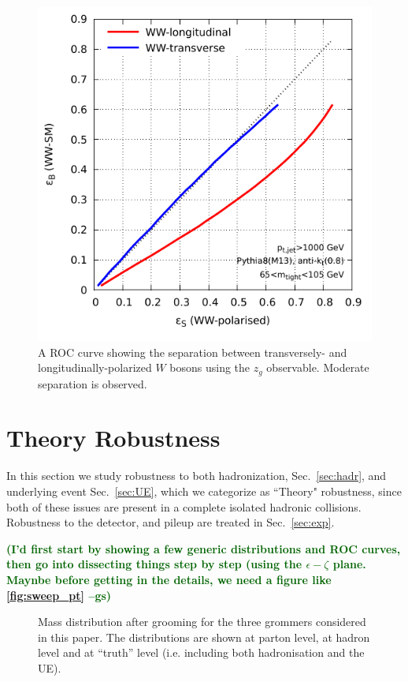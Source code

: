 \documentclass[11pt,letterpaper]{article}
\DeclareRobustCommand{\Sec}[1]{Sec.~\ref{#1}}
\newcommand{\gs}[1]{\textbf{\textcolor{darkgreen}{(#1 --gs)}}}
\begin{document}
\begin{figure}
\begin{center}
\includegraphics[width=0.45\columnwidth]{figures/polarisation-zg-roc}
\end{center}
\caption{A ROC curve showing the separation between transversely- and longitudinally-polarized $W$ bosons using the $z_g$ observable. Moderate separation is observed.}
\label{fig:z_g_ROC}
\end{figure}



\section{Theory Robustness}\label{sec:np}


In this section we study robustness to both hadronization, \Sec{sec:hadr}, and underlying event \Sec{sec:UE}, which we categorize as ``Theory" robustness, since both of these issues are present in a complete isolated hadronic collisions. Robustness to the detector, and pileup are treated in \Sec{sec:exp}. 


\gs{I'd first start by showing a few generic distributions and ROC
  curves, then go into dissecting things step by step (using the
  $\epsilon-\zeta$ plane. Maynbe before getting in the details, we
  need a figure like \ref{fig:sweep_pt}}

\begin{figure}
  \caption{Mass distribution after grooming for the three grommers
    considered in this paper. The distributions are shown at parton
    level, at hadron level and at ``truth'' level (i.e. including both
    hadronisation and the UE).}\label{fig:mass-distribution}
\end{figure}
\end{document}
